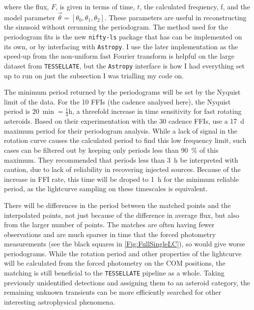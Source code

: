 \documentclass{UCreport}
\begin{document}
where the flux, $F$, is given in terms of time, $t$, the calculated frequency, f, and the model parameter $\vec{\theta} = [\theta_0, \theta_1,\theta_2]$.
These parameters are useful in reconstructing the sinusoid without rerunning the periodogram.
The method used for the periodogram fits is the new \texttt{nifty-ls} package \citep{Garrison2024} that has can be implemented on its own, or by interfacing with \texttt{Astropy}.
I use the later implementation as the speed-up from the non-uniform fast Fourier transform is helpful on the large dataset from \texttt{TESSELLATE}, but the \texttt{Astropy} interface is how I had everything set up to run on just the subsection I was trialling my code on.

The minimum period returned by the periodograms will be set by the Nyquist limit of the data. 
For the \qty{10}{\min} FFIs (the cadence analysed here), the Nyquist period is $\qty{20}{\min}=\frac13\unit{\hour}$, a threefold increase in time sensitivity for fast rotating asteroids.  
Based on their experimentation with the \qty{30}{\min} cadence FFIs, \citet{McNeill2023} use a \qty{17}{\day} maximum period for their periodogram analysis.
While a lack of signal in the rotation curve causes the calculated period to find this low frequency limit, such cases can be filtered out by keeping only periods less than \qty{90}{\percent} of this maximum. 
They recommended that periods less than \qty{3}{\hour} be interpreted with caution, due to lack of reliability in recovering injected sources.
Because of the increase in FFI rate, this time will be droped to \qty{1}{\hour} for the minimum reliable period, as the lightcurve sampling on these timescales is equivalent.

There will be differences in the period between the matched points and the interpolated points, not just because of the difference in average flux, but also from the larger number of points. 
The matches are often having fewer observations and are much sparser in time that the forced photometry measurements (see the black squares in \autoref{Fig:FullSingleLC}), so would give worse periodograms.
While the rotation period and other properties of the lightcurve will be calculated from the forced photometry on the COM positions, the matching is still beneficial to the \texttt{TESSELLATE} pipeline as a whole.
Taking previously unidentified detections and assigning them to an asteroid category, the remaining unknown transients can be more efficiently searched for other interesting astrophysical phenomena. 
\end{document}
